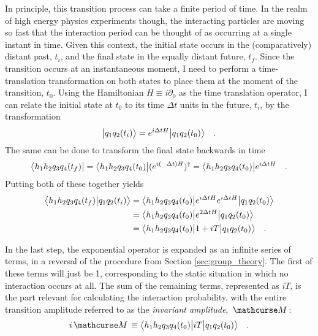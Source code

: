     In principle, this transition process can take a finite period of time.
    In the realm of high energy physics experiments though,
        the interacting particles are moving so fast that the interaction period can be thought of as occurring at a single instant in time.
    Given this context, the initial state occurs in the (comparatively) distant past, $t_i$, and the final state in the equally distant future, $t_f$.
    Since the transition occurs at an instantaneous moment,
        I need to perform a time-translation transformation on both states to place them at the moment of the transition, $t_0$.
    Using the Hamiltonian $H \equiv i\partial_0$ as the time translation operator,
        I can relate the initial state at $t_0$ to its time $\Delta t$ units in the future, $t_i$, by the transformation
    \begin{equation}
        \big| q_{1} q_{2} (t_i) \big> = e^{i\Delta tH}\big| q_{1} q_{2} (t_0) \big>
        \quad.
    \end{equation}
    The same can be done to transform the final state backwards in time
    \begin{equation}
        \big< h_1 h_2 q_{3} q_{4} (t_f) \big|
        = \big< h_1 h_2 q_{3} q_{4} (t_0) \big| (e^{i(-\Delta t)H})^\dag
        = \big< h_1 h_2 q_{3} q_{4} (t_0) \big| e^{i\Delta tH}
        \quad.
    \end{equation}
    Putting both of these together yields
    \begin{equation} \begin{split} \label{eq:transition_amplitude}
        \big<  h_1 h_2 q_{3} q_{4} (t_f) \big| q_{1} q_{2} (t_i) \big>
        &= \big<  h_1 h_2 q_{3} q_{4} (t_0) \big| e^{i\Delta tH} e^{i\Delta tH} \big| q_{1} q_{2} (t_0) \big>
        \\&= \big<  h_1 h_2 q_{3} q_{4} (t_0) \big| e^{2\Delta tH} \big| q_{1} q_{2} (t_0) \big>
        \\&= \big<  h_1 h_2 q_{3} q_{4} (t_0) \big| 1 + iT \big| q_{1} q_{2} (t_0) \big>
        \quad.
    \end{split} \end{equation}

    In the last step, the exponential operator is expanded as an infinite series of terms,
        in a reversal of the procedure from Section \ref{sec:group_theory}.
    The first of these terms will just be 1, corresponding to the static situation in which no interaction occurs at all.
    The sum of the remaining terms, represented as $iT$, is the part relevant for calculating the interaction probability,
        with the entire transition amplitude referred to as the \textit{invariant amplitude}, $\invAmp$:
    \begin{equation}
        i\invAmp \equiv \TbraketA{ h_1 h_2 q_{3} q_{4} (t_0)}{iT}{q_{1} q_{2} (t_0)}
        \quad.
    \end{equation}

